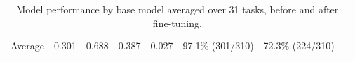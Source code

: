 \begin{table}[ht]
{\begin{tabular}{cccccccc}
Average              & 0.301                & 0.688                & 0.387                                                                   & 0.027                                                                               & 97.1\% (301/310)                                                                    & 72.3\% (224/310)                                                                   & \multicolumn{1}{l}{}                                                       
\end{tabular}
}
\caption{Model performance by base model averaged over 31 tasks, before and after fine-tuning.}
\label{table:performancesummarybymodel}
\end{table}


